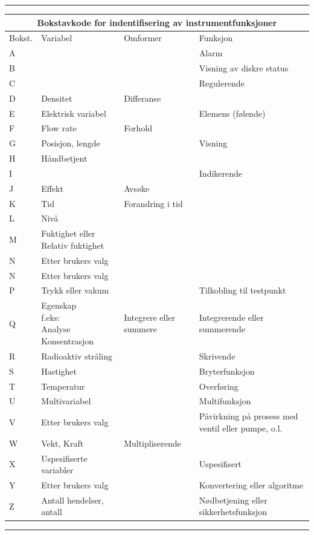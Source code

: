 \hrule
\small
\begin{center}
\begin{tabular}{ | m{1cm} | m{2.5cm}| m{2cm} | m{2.5cm} |} 
\hline
\multicolumn{4}{|c|}{Bokstavkode for indentifisering av instrumentfunksjoner} \\
\hline
	Bokst. & Variabel& Omformer & Funksjon \\ 
\hline
	A&&&Alarm\\
\hline
	B&&&Visning av diskre status\\
\hline
	C&&&Regulerende\\
\hline
	D&Densitet&Differanse&\\
\hline
	E&Elektrisk variabel&&Elemens (følende)\\
\hline
	F&Flow rate&Forhold&\\
\hline
	G&Posisjon, lengde&&Visning\\
\hline
	H&Håndbetjent&&\\
	\hline
	I&&&Indikerende\\
	\hline
	J&Effekt&Avsøke&\\
	\hline
	K&Tid&Forandring i tid&\\
	\hline
	L&Nivå&&\\
	\hline
	M&Fuktighet eller Relativ fuktighet&&\\
	\hline
	N&Etter brukers valg&&\\
	\hline
	N&Etter brukers valg&&\\
	\hline
	P&Trykk eller vakum&&Tilkobling til testpunkt\\
	\hline
	Q&\makecell{Egenskap\\f.eks:\\*Analyse\\*Konsentrasjon}&Integrere eller summere&Integrerende eller summerende\\
	\hline
	R&Radioaktiv stråling&&Skrivende\\
	\hline
	S&Hastighet&&Bryterfunksjon\\
	\hline
	T&Temperatur&&Overføring\\
	\hline
	U&Multivariabel&&Multifunksjon\\
	\hline
	V&Etter brukers valg& &Påvirkning på prosess med ventil eller pumpe, o.l.\\
	\hline
	W&Vekt, Kraft&Multipliserende&\\
	\hline
	X&Uspesifiserte variabler&&Uspesifisert\\
	\hline
	Y&Etter brukers valg&&Konvertering eller algoritme\\
	\hline
	Z&Antall hendelser, antall&&Nødbetjening eller sikkerhetsfunksjon\\
\hline
\end{tabular}
\end{center}
\normalsize
\vskip 5pt
\hrule

